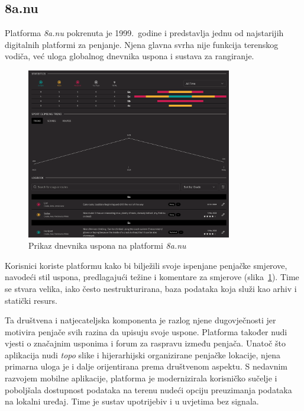 \subsection{8a.nu}

Platforma \textit{8a.nu} pokrenuta je 1999.\ godine i predstavlja jednu od najstarijih digitalnih platformi za penjanje. Njena glavna svrha nije funkcija terenskog vodiča, već uloga globalnog dnevnika uspona i sustava za rangiranje. 

\begin{figure}[H]
    \centering
    \includegraphics[width=0.8\textwidth]{images/analiza/8anu_logbook.png}
    \caption{Prikaz dnevnika uspona na platformi \textit{8a.nu}}
    \label{fig:8anu_logbook}
\end{figure}

Korisnici koriste platformu kako bi bilježili svoje ispenjane penjačke smjerove, navodeći stil uspona, predlagajući težine i komentare za smjerove (slika~\ref{fig:8anu_logbook}). Time se stvara velika, iako često nestrukturirana, baza podataka koja služi kao arhiv i statički resurs.



Ta društvena i natjecateljska komponenta je razlog njene dugovječnosti jer motivira penjače svih razina da upisuju svoje uspone. Platforma također nudi vjesti o značajnim usponima i forum za raspravu između penjača. Unatoč što aplikacija nudi \textit{topo} slike i hijerarhijski organizirane penjačke lokacije, njena primarna uloga je i dalje orijentirana prema društvenom aspektu. 
S nedavnim razvojem mobilne aplikacije, platforma je modernizirala korisničko sučelje i poboljšala dostupnost podataka na terenu nudeći opciju preuzimanja podataka na lokalni uređaj. Time je sustav upotrijebiv i u uvjetima bez signala.


